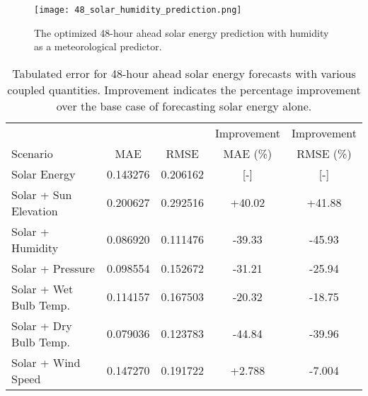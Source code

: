\begin{figure*}[!ht]
  \centering
  \texttt{[image: 48\_solar\_humidity\_prediction.png]}
  \caption{The optimized 48-hour ahead solar energy prediction with humidity as a  meteorological
  predictor.}
  \label{fig:solar48}
\end{figure*}
  \begin{table*}[!ht]
    \centering
    \caption{Tabulated error for 48-hour ahead solar energy forecasts with various coupled quantities. Improvement indicates the percentage improvement over the base case of forecasting solar energy alone.}
    \label{tab:solar48}
    \begin{tabular}{l|c|c|c|c}
      &  & & Improvement & Improvement \\
      Scenario  & MAE & RMSE & MAE (\%) & RMSE (\%)\\
      \hline
      Solar Energy & 0.143276 & 0.206162 & [-] & [-] \\
      Solar + Sun Elevation & 0.200627 & 0.292516 & +40.02 & +41.88\\
      Solar + Humidity & 0.086920 & 0.111476 & -39.33& -45.93\\
      Solar + Pressure & 0.098554 & 0.152672 &-31.21& -25.94\\
      Solar + Wet Bulb Temp. & 0.114157 & 0.167503 & -20.32& -18.75\\
      Solar + Dry Bulb Temp. & 0.079036 & 0.123783 & -44.84& -39.96\\
      Solar + Wind Speed & 0.147270 & 0.191722 & +2.788& -7.004\\
    \end{tabular}
  \end{table*}
